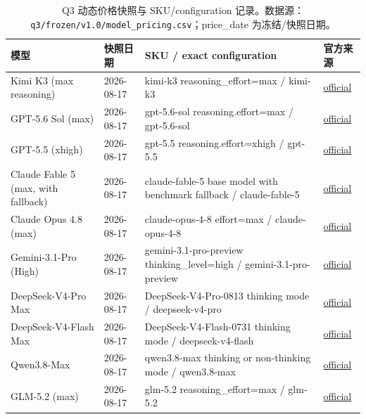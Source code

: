 \begin{table}[htbp]
\centering
\caption{Q3 动态价格快照与 SKU/configuration 记录。数据源：\texttt{q3/frozen/v1.0/model\_pricing.csv}；price\_date 为冻结/快照日期。}
\label{tab:pricing_snapshot}
\scriptsize
\begin{tabularx}{\textwidth}{p{3.0cm}p{1.6cm}p{6.0cm}X}
\toprule
模型 & 快照日期 & SKU / exact configuration & 官方来源\\
\midrule
Kimi K3 (max reasoning) & 2026-08-17 & kimi-k3 reasoning\_effort=max / kimi-k3 & \href{https://platform.kimi.com/docs/pricing/chat-k3.md}{official} \\
GPT-5.6 Sol (max) & 2026-08-17 & gpt-5.6-sol reasoning.effort=max / gpt-5.6-sol & \href{https://developers.openai.com/api/docs/models/gpt-5.6-sol}{official} \\
GPT-5.5 (xhigh) & 2026-08-17 & gpt-5.5 reasoning.effort=xhigh / gpt-5.5 & \href{https://developers.openai.com/api/docs/models/gpt-5.5}{official} \\
Claude Fable 5 (max, with fallback) & 2026-08-17 & claude-fable-5 base model with benchmark fallback / claude-fable-5 & \href{https://docs.anthropic.com/en/docs/about-claude/pricing}{official} \\
Claude Opus 4.8 (max) & 2026-08-17 & claude-opus-4-8 effort=max / claude-opus-4-8 & \href{https://docs.anthropic.com/en/docs/about-claude/pricing}{official} \\
Gemini-3.1-Pro (High) & 2026-08-17 & gemini-3.1-pro-preview thinking\_level=high / gemini-3.1-pro-preview & \href{https://ai.google.dev/gemini-api/docs/pricing}{official} \\
DeepSeek-V4-Pro Max & 2026-08-17 & DeepSeek-V4-Pro-0813 thinking mode / deepseek-v4-pro & \href{https://api-docs.deepseek.com/quick_start/pricing}{official} \\
DeepSeek-V4-Flash Max & 2026-08-17 & DeepSeek-V4-Flash-0731 thinking mode / deepseek-v4-flash & \href{https://api-docs.deepseek.com/quick_start/pricing}{official} \\
Qwen3.8-Max & 2026-08-17 & qwen3.8-max thinking or non-thinking mode / qwen3.8-max & \href{https://help.aliyun.com/zh/model-studio/model-pricing}{official} \\
GLM-5.2 (max) & 2026-08-17 & glm-5.2 reasoning\_effort=max / glm-5.2 & \href{https://docs.bigmodel.cn/cn/guide/models/text/glm-5.2.md}{official} \\
\bottomrule
\end{tabularx}
\end{table}
